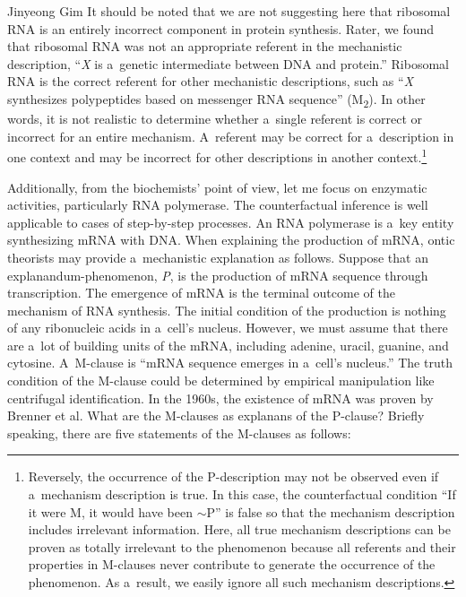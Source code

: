 \begin{artengenv}{Jinyeong Gim}
It should be noted that we are not suggesting here that ribosomal RNA is an entirely incorrect component in protein synthesis. Rater, we found that ribosomal RNA was not an appropriate referent in the mechanistic description, ``\textit{X} is a~genetic intermediate between DNA and protein.'' Ribosomal RNA is the correct referent for other mechanistic descriptions, such as ``\textit{X} synthesizes polypeptides based on messenger RNA sequence'' (M\textsubscript{2}). In other words, it is not realistic to determine whether a~single referent is correct or incorrect for an entire mechanism. A~referent may be correct for a~description in one context and may be incorrect for other descriptions in another context.\footnote{Reversely, the occurrence of the P-description may not be observed even if a~mechanism description is true. In this case, the counterfactual condition ``If it were M, it would have been $\sim$P'' is false so that the mechanism description includes irrelevant information. Here, all true mechanism descriptions can be proven as totally irrelevant to the phenomenon because all referents and their properties in M-clauses never contribute to generate the occurrence of the phenomenon. As a~result, we easily ignore all such mechanism descriptions.}

Additionally, from the biochemists' point of view, let me focus on enzymatic activities, particularly RNA polymerase. The counterfactual inference is well applicable to cases of step-by-step processes. An RNA polymerase is a~key entity synthesizing mRNA with DNA. When explaining the production of mRNA, ontic theorists may provide a~mechanistic explanation as follows. Suppose that an explanandum-phenomenon, \textit{P}, is the production of mRNA sequence through transcription. The emergence of mRNA is the terminal outcome of the mechanism of RNA synthesis. The initial condition of the production is nothing of any ribonucleic acids in a~cell's nucleus. However, we must assume that there are a~lot of building units of the mRNA, including adenine, uracil, guanine, and cytosine. A~M-clause is ``mRNA sequence emerges in a~cell's nucleus.'' The truth condition of the M-clause could be determined by empirical manipulation like centrifugal identification. In the 1960s, the existence of mRNA was proven by Brenner et al. What are the M-clauses as explanans of the P-clause? Briefly speaking, there are five statements of the M-clauses as follows:


\end{artengenv}
